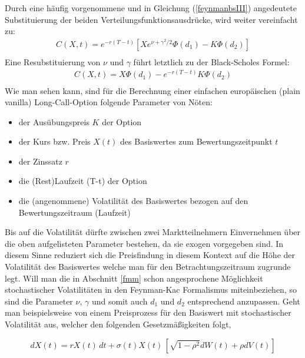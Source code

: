 \documentclass[12pt,a4paper,headsepline,bibliography=totoc,listof=totoc,headinclude=false,footinclude=false,BCOR5mm]{scrreprt} %
\begin{document}
 Durch eine  h\"aufig vorgenommene und in Gleichung (\ref{feynmanbsIII}) angedeutete Substituierung der beiden Verteilungsfunktionsausdr\"ucke, wird weiter vereinfacht zu:
\begin{equation} \label{feynmanbseinf}\begin{split}
C(X,t) =e^{-r(T-t)} \left[ Xe^{\nu + \gamma^{2}/2}  \Phi(d_1) - K \Phi(d_2) \right] \\
\end{split}\end{equation}
Eine Resubstituierung von $\nu$ und $\gamma$ f\"uhrt letztlich zu der Black-Scholes Formel:
\begin{equation} \label{BS}\begin{split}
C(X,t) =X\Phi(d_1) - e^{-r(T-t)} K \Phi(d_2)  \\
\end{split}\end{equation}
Wie man sehen kann, sind f\"ur die Berechnung einer einfachen europ\"aischen (plain vanilla) Long-Call-Option folgende Parameter von N\"oten:

  \begin{itemize}
\item der Aus\"ubungspreis $K$ der Option
\item der Kurs bzw. Preis $X(t)$ des Basiswertes zum Bewertungszeitpunkt $t$
\item der Zinssatz $r$ 
\item die (Rest)Laufzeit (T-t) der Option
\item die (angenommene) Volatilit\"at des Basiswertes bezogen auf den Bewertungszeitraum (Laufzeit)
  \end{itemize}
Bis auf die Volatilit\"at d\"urfte zwischen zwei Marktteilnehmern Einvernehmen \"uber die oben aufgelisteten Parameter bestehen, da sie exogen vorgegeben sind. In diesem Sinne reduziert sich die Preisfindung in diesem Kontext auf die H\"ohe der Volatilit\"at des Basiswertes welche man f\"ur den Betrachtungszeitraum zugrunde legt.
Will man die in Abschnitt \ref{fmm} schon angesprochene M\"oglichkeit stochastischer Volatilit\"aten in den Feynman-Kac Formalismus miteinbeziehen, so sind die Parameter $\nu$, $\gamma$ und somit auch $d_1$ und $d_2$ entsprechend anzupassen. Geht man beispielsweise von einem Preisprozess f\"ur den Basiswert mit stochastischer Volatilit\"at aus, welcher den folgenden Gesetzm\"a{\ss}igkeiten folgt,

 \begin{equation} \label{stochvola}dX(t)=  rX(t) \, dt +  \sigma(t)X(t) \, \left [ \sqrt{1-\rho^2}dW(t)  + \rho dV(t)\right ]
\end{equation}
\end{document}

